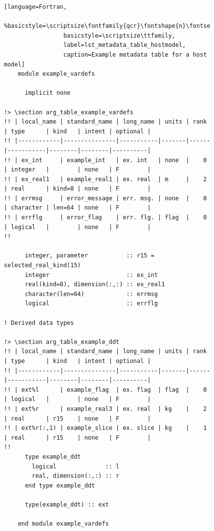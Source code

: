 \begin{figure}
\begin{lstlisting}[language=Fortran,
                 %basicstyle=\scriptsize\fontfamily{qcr}\fontshape{n}\fontseries{l}\selectfont
                 basicstyle=\scriptsize\ttfamily,
                 label=lst_metadata_table_hostmodel,
                 caption=Example metadata table for a host model]
    module example_vardefs

      implicit none

!> \section arg_table_example_vardefs
!! | local_name | standard_name | long_name | units | rank | type      | kind   | intent | optional |
!! |------------|---------------|-----------|-------|------|-----------|--------|--------|----------|
!! | ex_int     | example_int   | ex. int   | none  |    0 | integer   |        | none   | F        |
!! | ex_real1   | example_real1 | ex. real  | m     |    2 | real      | kind=8 | none   | F        |
!! | errmsg     | error_message | err. msg. | none  |    0 | character | len=64 | none   | F        |
!! | errflg     | error_flag    | err. flg. | flag  |    0 | logical   |        | none   | F        |
!!

      integer, parameter           :: r15 = selected_real_kind(15)
      integer                      :: ex_int
      real(kind=8), dimension(:,:) :: ex_real1
      character(len=64)            :: errmsg
      logical                      :: errflg

! Derived data types

!> \section arg_table_example_ddt
!! | local_name | standard_name | long_name | units | rank | type      | kind   | intent | optional |
!! |------------|---------------|-----------|-------|------|-----------|--------|--------|----------|
!! | ext%l      | example_flag  | ex. flag  | flag  |    0 | logical   |        | none   | F        |
!! | ext%r      | example_real3 | ex. real  | kg    |    2 | real      | r15    | none   | F        |
!! | ext%r(:,1) | example_slice | ex. slice | kg    |    1 | real      | r15    | none   | F        |
!!
      type example_ddt
        logical              :: l
        real, dimension(:,:) :: r
      end type example_ddt

      type(example_ddt) :: ext

    end module example_vardefs
\end{lstlisting}
\end{figure}

